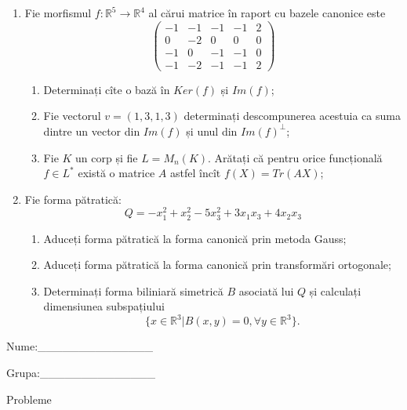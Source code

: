 \documentclass{article}
\begin{document}
\begin{enumerate}
 \item Fie morfismul $f:\mathbb{R}^5 \to \mathbb{R}^4$ al cărui matrice în raport cu bazele canonice este
$$\begin{pmatrix}
-1&-1&-1&-1&2\\
0&-2&0&0&0\\
-1&0&-1&-1&0\\
-1&-2&-1&-1&2
\end{pmatrix}$$

\begin{enumerate}
\item Determinați cîte o bază în $Ker(f)$ și $Im(f)$;
\item Fie vectorul $v=(1,3,1,3)$ determinați descompunerea acestuia ca suma dintre un vector din $Im(f)$ și unul din $Im(f)^\perp$;
\item Fie $K$ un corp și fie $L=M_n(K)$. Arătați că pentru orice funcțională $f \in L^*$ există o matrice $A$ astfel încît $f(X)=Tr(AX)$;
\end{enumerate}
\item Fie forma pătratică:
$$Q= -x_1^2+x_2^2-5x_3^2+3x_1x_3+4x_2x_3$$

\begin{enumerate}
\item Aduceți forma pătratică la forma canonică prin metoda Gauss;
\item Aduceți forma pătratică la forma canonică prin transformări ortogonale;
\item Determinați forma biliniară simetrică $B$ asociată lui $Q$ și calculați dimensiunea subspațiului
$$\{x \in \mathbb{R}^3 | B(x,y)=0,\forall y \in \mathbb{R}^3\}.$$

\end{enumerate}
\end{enumerate}
\newpage
\begin{flushright}
Nume:\_\_\_\_\_\_\_\_\_\_\_\_\_\_
 
 
Grupa:\_\_\_\_\_\_\_\_\_\_\_\_\_\_
\end{flushright}
\begin{center}
\vspace{2cm}
{\Large Probleme}
\vspace{2cm}
\end{center}
\end{document}
